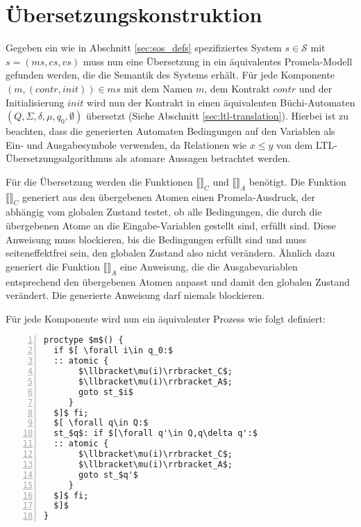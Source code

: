\section{Übersetzungskonstruktion}
Gegeben ein wie in Abschnitt \ref{sec:sos_defs} spezifiziertes System $s\in \mathcal{S}$ mit $s=(ms,cs,vs)$ muss nun eine Übersetzung in ein äquivalentes Promela-Modell gefunden werden, die die Semantik des Systems erhält.
Für jede Komponente $(m,(\mathit{contr},\mathit{init}))\in ms$ mit dem Namen $m$, dem Kontrakt $\mathit{contr}$ und der Initialisierung $\mathit{init}$ wird nun der Kontrakt in einen äquivalenten Büchi-Automaten $(Q,\Sigma,\delta,\mu,q_0,\emptyset)$ übersetzt (Siehe Abschnitt \ref{sec:ltl-translation}).
Hierbei ist zu beachten, dass die generierten Automaten Bedingungen auf den Variablen als Ein- und Ausgabesymbole verwenden, da Relationen wie $x\leq y$ von dem LTL-Übersetzungsalgorithmus als atomare Aussagen betrachtet werden.

Für die Übersetzung werden die Funktionen $\llbracket\rrbracket_C$ und $\llbracket\rrbracket_A$ benötigt.
Die Funktion $\llbracket\rrbracket_C$ generiert aus den übergebenen Atomen einen Promela-Ausdruck, der abhängig vom globalen Zustand testet, ob alle Bedingungen, die durch die übergebenen Atome an die Eingabe-Variablen gestellt sind, erfüllt sind.
Diese Anweisung muss blockieren, bis die Bedingungen erfüllt sind und muss seiteneffektfrei sein, den globalen Zustand also nicht verändern.
Ähnlich dazu generiert die Funktion $\llbracket\rrbracket_A$ eine Anweisung, die die Ausgabevariablen entsprechend den übergebenen Atomen anpasst und damit den globalen Zustand verändert.
Die generierte Anweisung darf niemals blockieren.

Für jede Komponente wird nun ein äquivalenter Prozess wie folgt definiert:
\begin{lstlisting}[language=Promela,mathescape=true,numbers=left,numberstyle=\small,caption={Komponenten-Übersetzung als Promela-Prozess}]
proctype $m$() {
  if $[ \forall i\in q_0:$
  :: atomic {
       $\llbracket\mu(i)\rrbracket_C$;
       $\llbracket\mu(i)\rrbracket_A$;
       goto st_$i$
     }
  $]$ fi;
  $[ \forall q\in Q:$
  st_$q$: if $[\forall q'\in Q,q\delta q':$
  :: atomic {
       $\llbracket\mu(i)\rrbracket_C$;
       $\llbracket\mu(i)\rrbracket_A$;
       goto st_$q'$
     }
  $]$ fi;
  $]$
}
\end{lstlisting}

